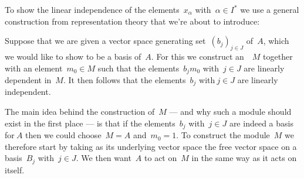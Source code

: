 \begin{construction}
  To show the linear independence of the elements~$x_\alpha$ with~$\alpha \in I^*$ we use a general construction from representation theory that we’re about to introduce:
  
  Suppose that we are given a vector space generating set~$(b_j)_{j \in J}$ of~$A$, which we would like to show to be a basis of~$A$.
  For this we construct an~{}~$M$ together with an element~$m_0 \in M$ such that the elements~$b_j m_0$ with~$j \in J$ are linearly dependent in~$M$.
  It then follows that the elements~$b_j$ with$~j \in J$ are linearly independent.
  
  The main idea behind the construction of~$M$ --- and why such a module should exist in the first place --- is that if the elements~$b_j$ with~$j \in J$ are indeed a basis for$~A$ then we could choose~$M = A$ and~$m_0 = 1$.
  To construct the module~$M$ we therefore start by taking as its underlying vector space the free vector space on a basis~$B_j$ with~$j \in J$.
  We then want~$A$ to act on~$M$ in the same way as it acts on itself.
  

\end{construction}
